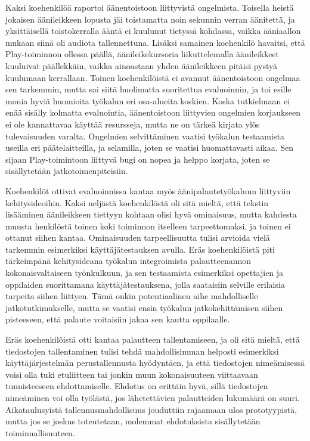 \documentclass[utf8]{gradu3}
\begin{document}
Kaksi koehenkilöä raportoi äänentoistoon liittyvistä ongelmista. Toisella heistä jokaisen äänileikkeen lopusta jäi toistamatta noin sekunnin verran äänitettä, ja yksittäisellä toistokerralla ääntä ei kuulunut tietyssä kohdassa, vaikka ääniaallon mukaan siinä oli audiota tallennettuna. Lisäksi samainen koehenkilö havaitsi, että Play-toiminnon ollessa päällä, äänileikekursoria liikuttelemalla äänileikkeet kuuluivat päällekkäin, vaikka ainoastaan yhden äänileikkeen pitäisi pystyä kuulumaan kerrallaan. Toinen koehenkilöistä ei avannut äänentoistoon ongelmaa sen tarkemmin, mutta sai siitä huolimatta suoritettua evaluoinnin, ja toi esille monia hyviä huomioita työkalun eri osa-alueita koskien. Koska tutkielmaan ei enää sisälly kolmatta evaluointia, äänentoistoon liittyvien ongelmien korjaukseen ei ole kannattavaa käyttää resursseja, mutta ne on tärkeä kirjata ylös tulevaisuuden varalta. Ongelmien selvittäminen vaatisi työkalun testaamista useilla eri päätelaitteilla, ja selamilla, joten se vaatisi huomattavasti aikaa. Sen sijaan Play-toimintoon liittyvä bugi on nopea ja helppo korjata, joten se sisällytetään jatkotoimenpiteisiin.

Koehenkilöt ottivat evaluoinnissa kantaa myös äänipalautetyökaluun liittyviin kehitysideoihin. Kaksi neljästä koehenkilöstä oli sitä mieltä, että tekstin lisääminen äänileikkeen tiettyyn kohtaan olisi hyvä ominaisuus, mutta kahdesta muusta henkilöstä toinen koki toiminnon itselleen tarpeettomaksi, ja toinen ei ottanut siihen kantaa. Ominaisuuden tarpeellisuutta tulisi arvioida vielä tarkemmin esimerkiksi käyttäjätestauksen avulla. Eräs koehenkilöistä piti tärkeimpänä kehitysideana työkalun integroimista palautteenannon kokonaisvaltaiseen työnkulkuun, ja sen testaamista esimerkiksi opettajien ja oppilaiden suorittamana käyttäjätestauksena, jolla saataisiin selville erilaisia tarpeita siihen liittyen. Tämä onkin potentiaalinen aihe mahdolliselle jatkotutkimukselle, mutta se vaatisi ensin työkalun jatkokehittämisen siihen pisteeseen, että palaute voitaisiin jakaa sen kautta oppilaalle.

Eräs koehenkilöistä otti kantaa palautteen tallentamiseen, ja oli sitä mieltä, että tiedostojen tallentaminen tulisi tehdä mahdollisimman helposti esimerkiksi käyttäjärjestelmän perustallennusta hyödyntäen, ja että tiedostojen nimeämisessä voisi olla tuki etuliitteen tai jonkin muun kokonaisuuteen viittaavaan tunnisteeseen ehdottamiselle. Ehdotus on erittäin hyvä, sillä tiedostojen nimeäminen voi olla työlästä, jos lähetettävien palautteiden lukumäärä on suuri. Aikataulusyistä tallennusmahdollisuus jouduttiin rajaamaan ulos prototyypistä, mutta jos se joskus toteutetaan, molemmat ehdotuksista sisällytetään toiminnallisuuteen.
\end{document}
